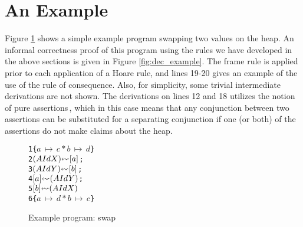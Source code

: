 \section{An Example}
Figure \ref{fig:example} shows a simple example program swapping two values on the heap. An informal correctness proof of this program using the rules we have developed in the above sections is given in Figure \ref{fig:dec_example}. The frame rule is applied prior to each application of a Hoare rule, and lines 19-20 gives an example of the use of the rule of consequence. Also, for simplicity, some trivial intermediate derivations are not shown. The derivations on lines 12 and 18 utilizes the notion of pure assertions\,\cite{reynolds2008AnIntroductionTo}, which in this case means that any conjunction between two assertions can be substituted for a separating conjunction if one (or both) of the assertions do not make claims about the heap.
\begin{figure}
\begin{alltt}
                        1  \{\( a\,\mapsto\,c * b\,\mapsto\,d \)\}
                        2     \((AId X) \lsquigarr [ a ]\);
                        3     \((AId Y) \lsquigarr [ b ]\);
                        4     \([ a ] \lsquigarr (AId Y)\);
                        5     \([ b ] \lsquigarr (AId X)\)
                        6  \{\({ a\,\mapsto\,d * b\,\mapsto\,c }\)\}
\end{alltt}
\caption{Example program: swap}
\label{fig:example}
\end{figure}

